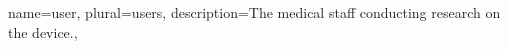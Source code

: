 \label{ch:glossary}
{
	name=user,
	plural=users,
	description={The medical staff conducting research on the device.},
}

